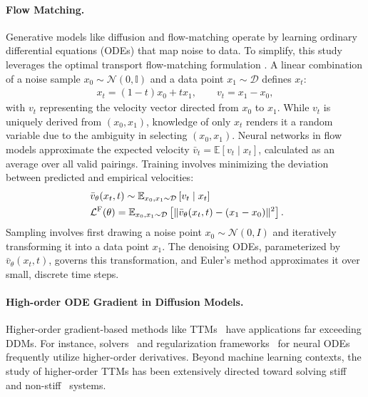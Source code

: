 \paragraph{Flow Matching. }
Generative models like diffusion \citep{swmg15, hja20, sme20} and flow-matching \citep{lcb+22, lgl22} operate by learning ordinary differential equations (ODEs) that map noise to data. To simplify, this study leverages the optimal transport flow-matching formulation \citep{lgl22}. A linear combination of a noise sample $x_0 \sim \mathcal{N}(0, \mathbb{I})$ and a data point $x_1 \sim \mathcal{D}$ defines $x_t$:
\begin{align*}
x_t = (1-t)x_0 + tx_1,
\qquad v_t = x_1 - x_0,
\end{align*}
with $v_t$ representing the velocity vector directed from $x_0$ to $x_1$. While $v_t$ is uniquely derived from $(x_0, x_1)$, knowledge of only $x_t$ renders it a random variable due to the ambiguity in selecting $(x_0, x_1)$. Neural networks in flow models approximate the expected velocity $\bar{v}_t = \mathbb{E}[v_t \mid x_t]$, calculated as an average over all valid pairings. Training involves minimizing the deviation between predicted and empirical velocities:
\begin{align}\label{eq:flow-matching}
& ~ \notag \bar{v}_\theta(x_t, t) \sim \mathbb{E}_{x_0,x_1 \sim \operatorname*{\mathcal{D}}} \left[ v_t \mid x_t \right] \\ 
& ~ \mathcal{L}^{\mathrm{F}}(\theta) = \mathbb{E}_{x_0,x_1 \sim \operatorname*{\mathcal{D}}} \left[ \| \bar{v}_\theta(x_t, t) - (x_1-x_0) \|^2 \right].
\end{align}
Sampling involves first drawing a noise point $x_0 \sim \mathcal{N}(0, I)$ and iteratively transforming it into a data point $x_1$. The denoising ODEs, parameterized by $\bar{v}_\theta(x_t, t)$, governs this transformation, and Euler’s method approximates it over small, discrete time steps.

\paragraph{High-order ODE Gradient in Diffusion Models. }

Higher-order gradient-based methods like TTMs~\cite{kp92} have applications far exceeding DDMs. For instance, solvers~\cite{dng+22} and regularization frameworks~\cite{kbjd20,fjno20} for neural ODEs~\cite{crbd18,gcb+18} frequently utilize higher-order derivatives. Beyond machine learning contexts, the study of higher-order TTMs has been extensively directed toward solving stiff~\cite{cc94} and non-stiff~\cite{cc94,cc82} systems.

